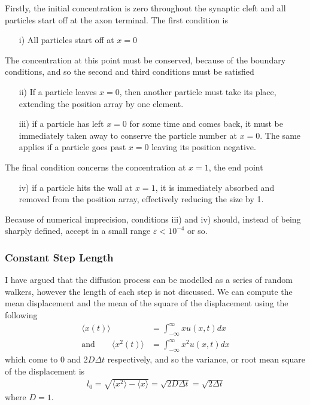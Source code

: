 \documentclass[twoside, 11pt]{article}
\begin{document}
		Firstly, the initial concentration is zero throughout the synaptic cleft and all particles start off at the axon terminal. The first condition is 
		\begin{itemize}
			\item[i)] All particles start off at $x=0$
		\end{itemize}
		The concentration at this point must be conserved, because of the boundary conditions, and so the second and third conditions must be satisfied
		\begin{itemize}
			\item[ii)] If a particle leaves $x=0$, then another particle must take its place, extending the position array by one element.
			\item[iii)] if a particle has left $x=0$ for some time and comes back, it must be immediately taken away to conserve the particle number at $x=0$. The same applies if a particle goes past $x=0$ leaving its position negative.
		\end{itemize}
		The final condition concerns the concentration at $x=1$, the end point
		\begin{itemize}
			\item[iv)] if a particle hits the wall at $x=1$, it is immediately absorbed and removed from the position array, effectively reducing the size by 1.
		\end{itemize}
		
		Because of numerical imprecision, conditions iii) and iv) should, instead of being sharply defined, accept in a small range $\varepsilon < 10^{-4}$ or so.
		
		\subsubsection{Constant Step Length}
			I have argued that the diffusion process can be modelled as a series of random walkers, however the length of each step is not discussed. We can compute the mean displacement and the mean of the square of the displacement using the following
			\begin{align}
				\langle x(t)\rangle &= \int_{-\infty}^\infty xu(x, t) dx \\
				\mathrm{and} \qquad \langle x^2(t) \rangle &= \int_{-\infty}^\infty x^2u(x, t)dx
			\end{align}
			which come to $0$ and $2D\Delta t$ respectively\cite{farnell2005monte}, and so the variance, or root mean square of the displacement is
			\begin{align*}
				l_0 = \sqrt{\langle x^2\rangle - \langle x \rangle} = \sqrt{2D\Delta t} = \sqrt{2\Delta t}
			\end{align*}
			where $D=1$.
		
\end{document}

